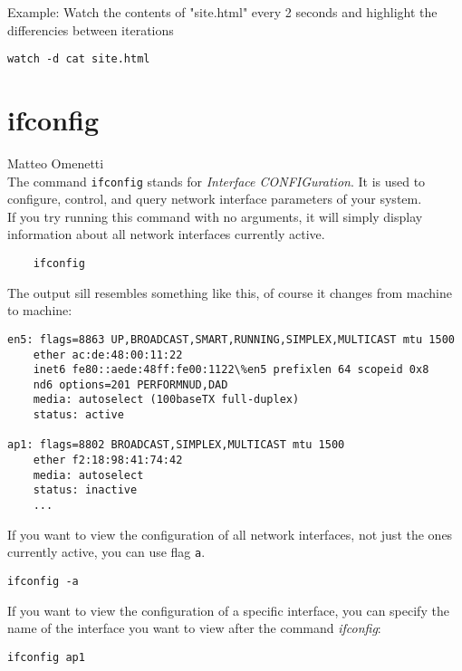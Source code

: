 \documentclass[hidelinks,12pt,a4paper,numbers=enddot]{scrartcl}
\begin{document}
Example: Watch the contents of "site.html" every 2 seconds and highlight the
differencies between iterations

\begin{verbatim}
watch -d cat site.html
\end{verbatim}

\section{ifconfig}


\large Matteo Omenetti \normalsize\\



The command \texttt{ifconfig} stands for \emph{Interface CONFIGuration}. It is used
to configure, control, and query network interface parameters of your system.\\
If you try running this command with no arguments, it will simply display information
about all network interfaces currently active.\\

\begin{verbatim}
    ifconfig
\end{verbatim}

The output sill resembles something like this, of course it changes from machine
to machine:

\begin{verbatim}
en5: flags=8863 UP,BROADCAST,SMART,RUNNING,SIMPLEX,MULTICAST mtu 1500
    ether ac:de:48:00:11:22
    inet6 fe80::aede:48ff:fe00:1122\%en5 prefixlen 64 scopeid 0x8
    nd6 options=201 PERFORMNUD,DAD
    media: autoselect (100baseTX full-duplex)
    status: active

ap1: flags=8802 BROADCAST,SIMPLEX,MULTICAST mtu 1500
    ether f2:18:98:41:74:42
    media: autoselect
    status: inactive
    ...
\end{verbatim}

If you want to view the configuration of all network interfaces, not just the ones
currently active, you can use flag \texttt{a}.

\begin{verbatim}
ifconfig -a
\end{verbatim}

If you want to view the configuration of a specific interface, you can specify
the name of the interface you want to view after the command \emph{ifconfig}:

\begin{verbatim}
ifconfig ap1
\end{verbatim}
\end{document}
